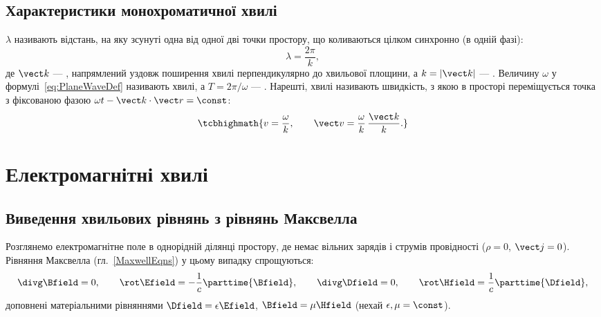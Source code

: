 \subsection*{Характеристики монохроматичної хвилі}

 $\lambda$ називають відстань, на яку зсунуті одна від одної дві точки простору, що коливаються цілком синхронно (в одній
фазі):
\begin{equation}\label{eq:Wavelength}
	\lambda = \frac{2\pi}{k},
\end{equation}
де $\vect k$ --- , напрямлений уздовж поширення хвилі перпендикулярно до хвильової площини, а $k=|\vect k|$ ---
. Величину $\omega$ у формулі~\eqref{eq:PlaneWaveDef} називають  хвилі, а $T=2\pi/\omega$ ---
. Нарешті,  хвилі називають швидкість, з якою в просторі переміщується точка з фіксованою фазою
$\omega t - \vect k\cdot\vect r = \const$:
\begin{equation}\label{eq:PhaseVelocity}
	\tcbhighmath{
		v = \frac\omega k, \qquad \vect v = \frac\omega k\,\frac{\vect k}k.
	}
\end{equation}

\section{Електромагнітні хвилі}

\subsection*{Виведення хвильових рівнянь з рівнянь Максвелла}

Розглянемо електромагнітне поле в однорідній ділянці простору, де немає вільних зарядів і струмів провідності ($\rho=0$, $\vect j=0$). Рівняння
Максвелла (гл.~\ref{MaxwellEqns}) у цьому випадку спрощуються:
\begin{equation}\label{eq:MaxwellNoSources}
	\divg\Bfield=0, \qquad \rot\Efield = -\frac1c\parttime{\Bfield}, \qquad \divg\Dfield=0, \qquad \rot\Hfield = \frac1c\parttime{\Dfield},
\end{equation}
доповнені матеріальними рівняннями $\Dfield=\epsilon\Efield$, $\Bfield=\mu\Hfield$ (нехай $\epsilon,\mu=\const$).

